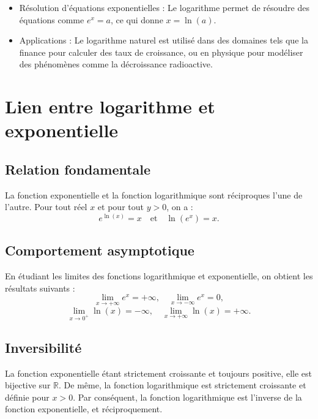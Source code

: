 \documentclass{article}
\begin{document}
	                                                                    \begin{itemize}
	                                                                    	\item Résolution d'équations exponentielles : Le logarithme permet de résoudre des équations comme \( e^x = a \), ce qui donne \( x = \ln(a) \).
	                                                                    	\item Applications : Le logarithme naturel est utilisé dans des domaines tels que la finance pour calculer des taux de croissance, ou en physique pour modéliser des phénomènes comme la décroissance radioactive.
	                                                                    \end{itemize}
	                                                                                                                                                                                  
	
	\section{Lien entre logarithme et exponentielle}
	
	\subsection{Relation fondamentale}
	
	La fonction exponentielle et la fonction logarithmique sont réciproques l'une de l'autre. Pour tout réel \( x \) et pour tout \( y > 0 \), on a :
	\[
	e^{\ln(x)} = x \quad \text{et} \quad \ln(e^x) = x.
	\]
	
	\subsection{Comportement asymptotique}
	
	En étudiant les limites des fonctions logarithmique et exponentielle, on obtient les résultats suivants :
	\[
	\lim_{x \to +\infty} e^x = +\infty, \quad \lim_{x \to -\infty} e^x = 0,
	\]
	\[
	\lim_{x \to 0^+} \ln(x) = -\infty, \quad \lim_{x \to +\infty} \ln(x) = +\infty.
	\]
	
	\subsection{Inversibilité}
	
	La fonction exponentielle étant strictement croissante et toujours positive, elle est bijective sur \( \mathbb{R} \). De même, la fonction logarithmique est strictement croissante et définie pour \( x > 0 \). Par conséquent, la fonction logarithmique est l'inverse de la fonction exponentielle, et réciproquement.
	
	
	
	
	
	
\end{document}
